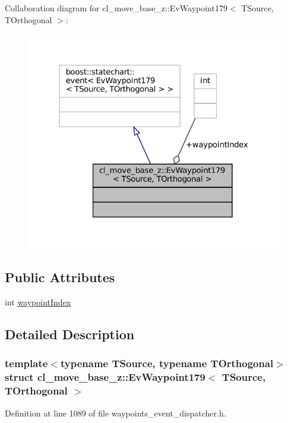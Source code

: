 Collaboration diagram for cl\+\_\+move\+\_\+base\+\_\+z\+:\+:Ev\+Waypoint179$<$ T\+Source, T\+Orthogonal $>$\+:
\nopagebreak
\begin{figure}[H]
\begin{center}
\leavevmode
\includegraphics[width=324pt]{structcl__move__base__z_1_1EvWaypoint179__coll__graph}
\end{center}
\end{figure}
\subsection*{Public Attributes}
\begin{DoxyCompactItemize}
\item 
int \hyperlink{structcl__move__base__z_1_1EvWaypoint179_a2bf995bcbd92aa3ba4f90f37f0b05f1a}{waypoint\+Index}
\end{DoxyCompactItemize}


\subsection{Detailed Description}
\subsubsection*{template$<$typename T\+Source, typename T\+Orthogonal$>$\newline
struct cl\+\_\+move\+\_\+base\+\_\+z\+::\+Ev\+Waypoint179$<$ T\+Source, T\+Orthogonal $>$}



Definition at line 1089 of file waypoints\+\_\+event\+\_\+dispatcher.\+h.




